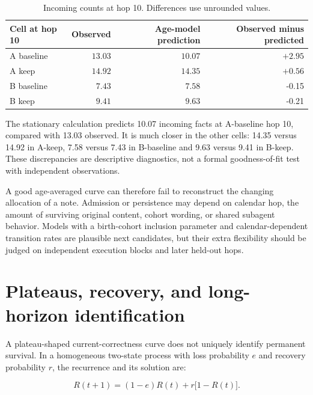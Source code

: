 \documentclass[10pt,letterpaper]{amsart}
\numberwithin{equation}{section}
\begin{document}
\begin{table}[!htbp]
  \centering
  \small
  \caption{Incoming counts at hop 10. Differences use unrounded values.}
  \label{tab:cohort-predictions}
  \begin{tabular}{@{}lrrr@{}}
    \toprule
    \textbf{Cell at hop 10} & \textbf{Observed} & \textbf{Age-model prediction} & \textbf{Observed minus predicted} \\
    \midrule
    A baseline & $13.03$ & $10.07$ & $+2.95$ \\
    A keep & $14.92$ & $14.35$ & $+0.56$ \\
    B baseline & $7.43$ & $7.58$ & -0.15 \\
    B keep & $9.41$ & $9.63$ & -0.21 \\
    \bottomrule
  \end{tabular}
\end{table}

The stationary calculation predicts 10.07 incoming facts at A-baseline hop 10, compared
with 13.03 observed. It is much closer in the other cells: 14.35 versus 14.92 in A-keep,
7.58 versus 7.43 in B-baseline and 9.63 versus 9.41 in B-keep. These discrepancies are
descriptive diagnostics, not a formal goodness-of-fit test with independent observations.

A good age-averaged curve can therefore fail to reconstruct the changing allocation of a
note. Admission or persistence may depend on calendar hop, the amount of surviving
original content, cohort wording, or shared subagent behavior. Models with a birth-cohort
inclusion parameter and calendar-dependent transition rates are plausible next candidates,
but their extra flexibility should be judged on independent execution blocks and later
held-out hops.

\section{Plateaus, recovery, and long-horizon identification}
\label{sec:identification}

A plateau-shaped current-correctness curve does not uniquely identify permanent survival.
In a homogeneous two-state process with loss probability $e$ and recovery probability $r$,
the recurrence and its solution are:

\begin{equation}
  \label{eq:recovery-recurrence}
  R(t+1) = (1-e)R(t) + r\bigl[1-R(t)\bigr].
\end{equation}
\end{document}

